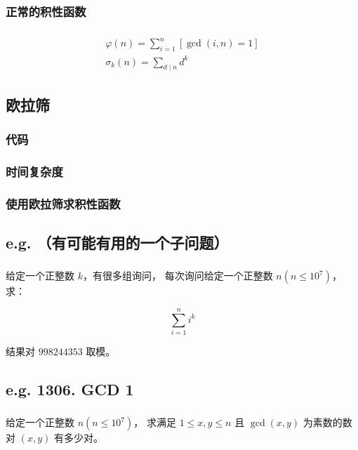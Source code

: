 \documentclass[UTF8]{beamer}
\begin{document}
	\subsubsection{正常的积性函数}
	\begin{frame}
		\frametitle{\insertsubsection}
		\begin{gather*}
			\varphi(n) = \sum _{i = 1} ^{n} [\gcd(i, n) = 1]
			\\
			\sigma_k(n) = \sum _{d \mid n} d^k
		\end{gather*}
	\end{frame}

	\subsection{欧拉筛}
	\subsubsection{代码}
	\begin{frame}
		\frametitle{\insertsubsection}
	\end{frame}

	\subsubsection{时间复杂度}
	\begin{frame}
		\frametitle{\insertsubsubsection}
	\end{frame}

	\subsubsection{使用欧拉筛求积性函数}
	\begin{frame}
		\frametitle{\insertsubsubsection}
	\end{frame}

	\subsection{e.g. （有可能有用的一个子问题）}
	\begin{frame}
		\frametitle{\insertsubsection}
		给定一个正整数 $k$，有很多组询问，
		每次询问给定一个正整数 $n(n \le 10^7)$，求：

		$$
		\sum_{i = 1}^{n} i^k
		$$

		结果对 $998244353$ 取模。
	\end{frame}

	\subsection{e.g. 1306. GCD 1}
	\begin{frame}
		\frametitle{\insertsubsection}
		给定一个正整数 $n(n \le 10^7)$，
		求满足 $1 \le x, y \le n$ 且 $\gcd(x, y)$ 为素数的数对 $(x, y)$ 有多少对。
	\end{frame}
\end{document}
